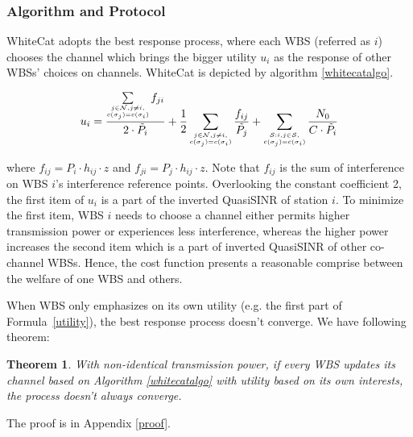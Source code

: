 \documentclass[times]{ettauth}
\theoremstyle{mytheoremstyle}
\newtheorem{theorem}{Theorem}[section]
\theoremstyle{mytheoremstyle}
\theoremstyle{mytheoremstyle}
\begin{document}
\subsubsection{Algorithm and Protocol}
WhiteCat adopts the best response process, where each WBS (referred as $i$) chooses the channel which brings the bigger utility $u_i$ as the response of other WBSs' choices on channels.
WhiteCat is depicted by algorithm \ref{whitecatalgo}.

\begin{equation}
\label{utility}
u_i =\dfrac{\sum\limits_{\tiny\substack{j\in \mathcal{N}, j\ne i,\\ c(\sigma_j)=c(\sigma_i)}}f_{ji}}{2\cdot \tilde{P_i}} + \dfrac{1}{2}\sum_{\tiny\substack{j\in \mathcal{N}, j\ne i,\\ c(\sigma_j)=c(\sigma_i)}}\dfrac{f_{ij}}{\tilde{P_j}} + \sum_{\tiny\substack{\mathcal{S}:i,j\in \mathcal{S},\\ c(\sigma_j)=c(\sigma_i)}}\dfrac{N_0}{C\cdot \tilde{P_i}}\\
\end{equation}

where $f_{ij}= P_i\cdot h_{ij}\cdot z$ and $f_{ji}= P_j\cdot h_{ij}\cdot z$.
Note that $f_{ij}$ is the sum of interference on WBS $i$'s interference reference points.
Overlooking the constant coefficient 2, the first item of $u_i$ is a part of the inverted QuasiSINR of station $i$. 
To minimize the first item, WBS $i$ needs to choose a channel either permits higher transmission power or experiences less interference, whereas the higher power increases the second item which is a part of inverted QuasiSINR of other co-channel WBSs. 
Hence, the cost function presents a reasonable comprise between the welfare of one WBS and others.

When WBS only emphasizes on its own utility (e.g. the first part of Formula~\ref{utility}), the best response process doesn't converge.
We have following theorem:
\begin{theorem}
\label{noconvergence}
\emph{With non-identical transmission power, if every WBS updates its channel based on Algorithm \ref{whitecatalgo} with utility based on its own interests, the process doesn't always converge.}
\end{theorem}
The proof is in Appendix \ref{proof}.
\end{document}
